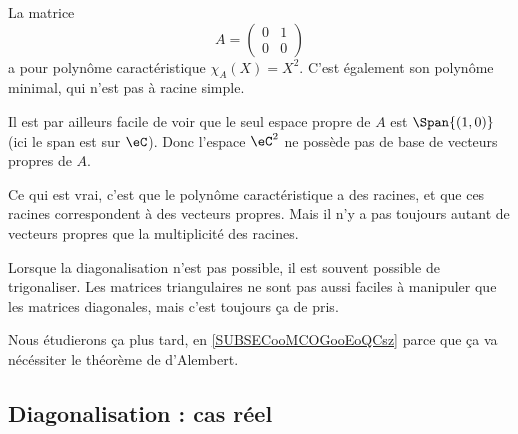 \begin{example}
    La matrice
    \begin{equation}
        A=\begin{pmatrix}
            0    &   1    \\
            0    &   0
        \end{pmatrix}
    \end{equation}
    a pour polynôme caractéristique \( \chi_A(X)=X^2\). C'est également son polynôme minimal, qui n'est pas à racine simple.

    Il est par ailleurs facile de voir que le seul espace propre de \( A\) est \( \Span\{ (1,0) \}\) (ici le span est sur \( \eC\)). Donc l'espace \( \eC^2\) ne possède pas de base de vecteurs propres de \( A\).
\end{example}

Ce qui est vrai, c'est que le polynôme caractéristique a des racines, et que ces racines correspondent à des vecteurs propres. Mais il n'y a pas toujours autant de vecteurs propres que la multiplicité des racines.

\begin{normaltext}
    Lorsque la diagonalisation n'est pas possible, il est souvent possible de trigonaliser. Les matrices triangulaires ne sont pas aussi faciles à manipuler que les matrices diagonales, mais c'est toujours ça de pris.

    Nous étudierons ça plus tard, en \ref{SUBSECooMCOGooEoQCsz} parce que ça va nécéssiter le théorème de d'Alembert.
\end{normaltext}

\subsection{Diagonalisation : cas réel}

